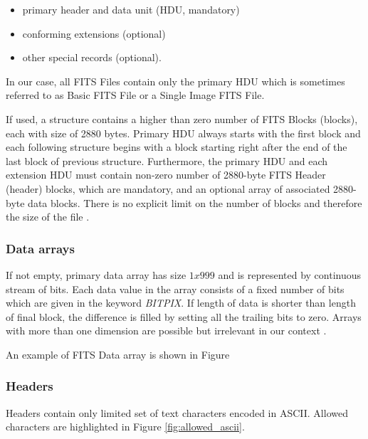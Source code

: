 	\begin{itemize}
		\item primary header and data unit (HDU, mandatory)
		\item conforming extensions (optional)
		\item other special records (optional).
	\end{itemize}
	
	In our case, all FITS Files contain only the primary HDU which is sometimes referred to as Basic FITS File or a Single Image FITS File.
	
	If used, a structure contains a higher than zero number of FITS Blocks (blocks), each with size of 2880 bytes. Primary HDU always starts with the first block and each following structure begins with a block starting right after the end of the last block of previous structure. Furthermore, the primary HDU and each extension HDU must contain non-zero number of 2880-byte FITS Header (header) blocks, which are mandatory, and an optional array of associated 2880-byte data blocks. There is no explicit limit on the number of blocks and therefore the size of the file \citep{FITSdefinition}.
	
\subsubsection{Data arrays} 
	
	If not empty, primary data array has size $1 x 999$ and is represented by continuous stream of bits. Each data value in the array consists of a fixed number of bits which are given in the keyword \emph{BITPIX}. If length of data is shorter than length of final block, the difference is filled by setting all the trailing bits to zero. Arrays with more than one dimension are possible but irrelevant in our context \citep{FITSdefinition}.
	
	An example of FITS Data array is shown in Figure
	
\subsubsection{Headers}

	Headers contain only limited set of text characters encoded in ASCII. Allowed characters are highlighted in Figure \ref{fig:allowed_ascii}.
	
